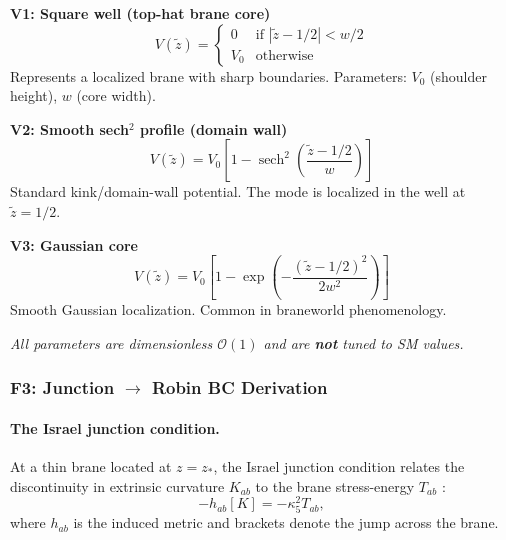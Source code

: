 \begin{tcolorbox}[colback=gray!5!white, colframe=gray!60!black,
    title=\textbf{Potential Models [P]}]

\textbf{V1: Square well (top-hat brane core)}
\begin{equation}
    V(\tilde{z}) = \begin{cases}
        0 & \text{if } |\tilde{z} - 1/2| < w/2 \\
        V_0 & \text{otherwise}
    \end{cases}
    \label{eq:attemptF_V1}
\end{equation}
Represents a localized brane with sharp boundaries. Parameters: $V_0$ (shoulder height),
$w$ (core width).

\medskip

\textbf{V2: Smooth sech$^2$ profile (domain wall)}
\begin{equation}
    V(\tilde{z}) = V_0 \left[ 1 - \operatorname{sech}^2\left(\frac{\tilde{z} - 1/2}{w}\right) \right]
    \label{eq:attemptF_V2}
\end{equation}
Standard kink/domain-wall potential. The mode is localized in the well at $\tilde{z} = 1/2$.

\medskip

\textbf{V3: Gaussian core}
\begin{equation}
    V(\tilde{z}) = V_0 \left[ 1 - \exp\left(-\frac{(\tilde{z} - 1/2)^2}{2w^2}\right) \right]
    \label{eq:attemptF_V3}
\end{equation}
Smooth Gaussian localization. Common in braneworld phenomenology.

\medskip

\emph{All parameters are dimensionless $\mathcal{O}(1)$ and are \textbf{not} tuned to SM values.}
\end{tcolorbox}

\subsubsection{F3: Junction $\to$ Robin BC Derivation}
\label{sec:attemptF_junction_robin}

\paragraph{The Israel junction condition.}
At a thin brane located at $z = z_*$, the Israel junction condition relates the
discontinuity in extrinsic curvature $K_{ab}$ to the brane stress-energy $T_{ab}$ \tagDc{}:
\begin{equation}
    [K_{ab}] - h_{ab} [K] = -\kappa_5^2 T_{ab},
    \label{eq:attemptF_Israel}
\end{equation}
where $h_{ab}$ is the induced metric and brackets denote the jump across the brane.

